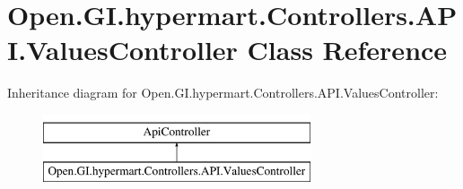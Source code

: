 \hypertarget{class_open_1_1_g_i_1_1hypermart_1_1_controllers_1_1_a_p_i_1_1_values_controller}{}\section{Open.\+G\+I.\+hypermart.\+Controllers.\+A\+P\+I.\+Values\+Controller Class Reference}
\label{class_open_1_1_g_i_1_1hypermart_1_1_controllers_1_1_a_p_i_1_1_values_controller}


 


Inheritance diagram for Open.\+G\+I.\+hypermart.\+Controllers.\+A\+P\+I.\+Values\+Controller\+:\begin{figure}[H]
\begin{center}
\leavevmode
\includegraphics[height=2.000000cm]{class_open_1_1_g_i_1_1hypermart_1_1_controllers_1_1_a_p_i_1_1_values_controller}
\end{center}
\end{figure}
